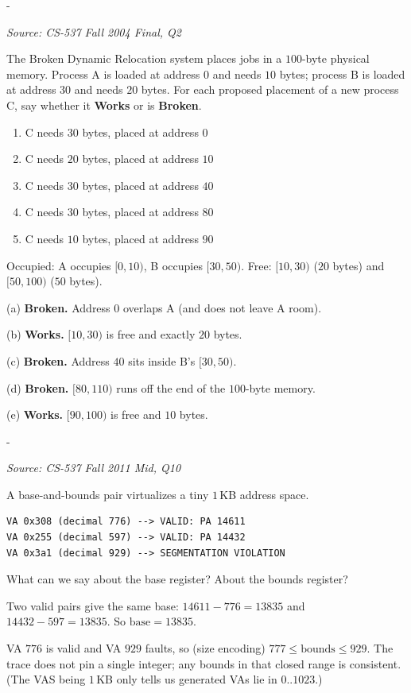 \documentclass[11pt,a4paper]{article}
\makeatletter
\newcommand{\keepspace}[1]{\par\penalty-100\begingroup
  \setlength{\dimen@}{#1}\dimen@ii\pagegoal\advance\dimen@ii-\pagetotal
  \ifdim\dimen@>\dimen@ii\ifdim\dimen@ii>\z@\vfil\fi\break\fi\endgroup}
\newcounter{qn}[section]
\newenvironment{Qn}[4]{%
  \refstepcounter{qn}\keepspace{7\baselineskip}%
  \begin{tcolorbox}[qboxstyle, title={Q\thesection.\theqn\ \ [#1 \textbar\ #2]\ \ #4}]%
  {\footnotesize\color{g3}\textit{Source: #3}}\par\smallskip%
}{%
  \end{tcolorbox}%
}
\newenvironment{Sol}{%
  \begin{tcolorbox}[sboxstyle, title={Solution}]%
}{%
  \end{tcolorbox}\vspace{0.35em}%
}
\makeatother
\begin{document}
\begin{Qn}{Medium}{Lect 9}{CS-537 Fall 2004 Final, Q2}{Broken Dynamic Relocation: which placements actually fit?}
The Broken Dynamic Relocation system places jobs in a $100$-byte
physical memory. Process A is loaded at address $0$ and needs $10$
bytes; process B is loaded at address $30$ and needs $20$ bytes.
For each proposed placement of a new process C, say whether it
\textbf{Works} or is \textbf{Broken}.
\begin{enumerate}
  \item[(a)] C needs $30$ bytes, placed at address $0$
  \item[(b)] C needs $20$ bytes, placed at address $10$
  \item[(c)] C needs $30$ bytes, placed at address $40$
  \item[(d)] C needs $30$ bytes, placed at address $80$
  \item[(e)] C needs $10$ bytes, placed at address $90$
\end{enumerate}
\end{Qn}
\begin{Sol}
Occupied: A occupies $[0,10)$, B occupies $[30,50)$. Free:
$[10,30)$ ($20$ bytes) and $[50,100)$ ($50$ bytes).

(a) \textbf{Broken.} Address $0$ overlaps A (and does not leave A
room).

(b) \textbf{Works.} $[10,30)$ is free and exactly $20$ bytes.

(c) \textbf{Broken.} Address $40$ sits inside B's $[30,50)$.

(d) \textbf{Broken.} $[80,110)$ runs off the end of the $100$-byte
memory.

(e) \textbf{Works.} $[90,100)$ is free and $10$ bytes.
\end{Sol}

\begin{Qn}{Medium}{Lect 9}{CS-537 Fall 2011 Mid, Q10}{Infer base and bounds from three translations}
A base-and-bounds pair virtualizes a tiny $1$\,KB address space.
\begin{lstlisting}[numbers=none]
VA 0x308 (decimal 776) --> VALID: PA 14611
VA 0x255 (decimal 597) --> VALID: PA 14432
VA 0x3a1 (decimal 929) --> SEGMENTATION VIOLATION
\end{lstlisting}
What can we say about the base register? About the bounds register?
\end{Qn}
\begin{Sol}
Two valid pairs give the same base:
$14611-776=13835$ and $14432-597=13835$. So
$\mathrm{base}=13835$.

VA $776$ is valid and VA $929$ faults, so (size encoding)
$777\le\mathrm{bounds}\le 929$. The trace does not pin a single
integer; any bounds in that closed range is consistent. (The VAS
being $1$\,KB only tells us generated VAs lie in $0..1023$.)
\end{Sol}
\end{document}
